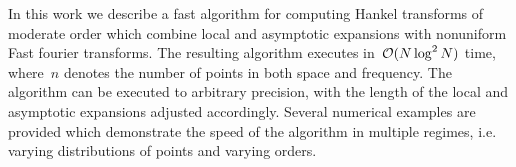 In this work we describe a fast algorithm for computing Hankel transforms of
moderate order which combine local and asymptotic expansions with nonuniform
Fast fourier transforms. The resulting algorithm executes in~$\mathcal{O} (N
\log^2 N)$ time, where~$n$ denotes the number of points in both space and
frequency.  The algorithm can be executed to arbitrary precision, with the
length of the local and asymptotic expansions adjusted accordingly. Several
numerical examples are provided which demonstrate the speed of the algorithm in
multiple regimes, i.e. varying distributions of points and varying orders.
